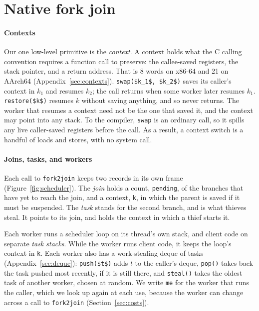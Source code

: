 \documentclass[sigplan,nonacm]{acmart}
\begin{document}
\section{Native fork join}
\label{sec:nfj}

\paragraph{Contexts}
%
Our one low-level primitive is the \emph{context}.
%
A context holds what the C calling convention requires a function
call to preserve: the callee-saved registers, the stack pointer, and a
return address.
%
That is 8 words on x86-64 and 21 on AArch64
(Appendix~\ref{sec:contexts}).
%
\lstinline|swap($k_1$, $k_2$)| saves its caller's context in $k_1$ and
resumes $k_2$; the call returns when some worker later resumes $k_1$.
%
\lstinline|restore($k$)| resumes $k$ without saving anything, and so
never returns.
%
The worker that resumes a context need not be the one that saved it,
and the context may point into any stack.
%
To the compiler, \lstinline|swap| is an ordinary call, so it spills
any live caller-saved registers before the call.
%
As a result, a context switch is a handful of loads and stores, with no
system call.

\paragraph{Joins, tasks, and workers}
%
Each call to \lstinline|fork2join| keeps two records in its own frame
(Figure~\ref{fig:scheduler}).
%
The \emph{join} holds a count, \lstinline|pending|, of the branches
that have yet to reach the join, and a context, \lstinline|k|, in which
the parent is saved if it must be suspended.
%
The \emph{task} stands for the second branch, and is what thieves
steal.
%
It points to its join, and holds the context in which a thief starts
it.

Each worker runs a scheduler loop on its thread's own stack, and
client code on separate \emph{task stacks}.
%
While the worker runs client code, it keeps the loop's context in
\lstinline|k|.
%
Each worker also has a work-stealing deque of tasks
(Appendix~\ref{sec:deque}): \lstinline|push($t$)| adds $t$ to the
caller's deque, \lstinline|pop()| takes back the task pushed most
recently, if it is still there, and \lstinline|steal()| takes the
oldest task of another worker, chosen at random.
%
We write \lstinline|me| for the worker that runs the caller, which we
look up again at each use, because the worker can change across a call
to \lstinline|fork2join| (Section~\ref{sec:costs}).
\end{document}
